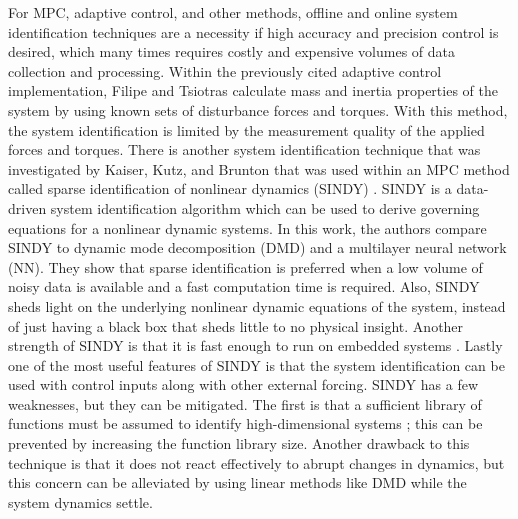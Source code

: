 \documentclass[letterpaper, preprint, paper,11pt]{AAS}	%
\begin{document}
For MPC, adaptive control, and other methods, offline and online system identification techniques are a necessity if high accuracy and precision control is desired, which many times requires costly and expensive volumes of data collection and processing. Within the previously cited adaptive control implementation, Filipe and Tsiotras calculate mass and inertia properties of the system by using known sets of disturbance forces and torques. With this method, the system identification is limited by the measurement quality of the applied forces and torques. There is another system identification technique that was investigated by Kaiser, Kutz, and Brunton that was used within an MPC method called sparse identification of nonlinear dynamics (SINDY) \cite{KaiserKutz_SparseID}. SINDY is a data-driven system identification algorithm which can be used to derive governing equations for a nonlinear dynamic systems. In this work, the authors compare SINDY to dynamic mode decomposition (DMD) and a multilayer neural network (NN). They show that sparse identification is preferred when a low volume of noisy data is available and a fast computation time is required. Also, SINDY sheds light on the underlying nonlinear dynamic equations of the system, instead of just having a black box that sheds little to no physical insight. Another strength of SINDY is that it is fast enough to run on embedded systems \cite{provost_williams_SINDY}. Lastly one of the most useful features of SINDY is that the system identification can be used with control inputs along with other external forcing. SINDY has a few weaknesses, but they can be mitigated. The first is that a sufficient library of functions must be assumed to identify high-dimensional systems \cite{KaiserKutz_SparseID}; this can be prevented by increasing the function library size. Another drawback to this technique is that it does not react effectively to abrupt changes in dynamics, but this concern can be alleviated by using linear methods like DMD while the system dynamics settle\cite{KaiserKutz_SparseID}.
 
\end{document}
